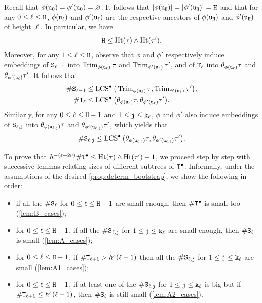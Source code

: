 \documentclass[11pt,reqno]{amsart}
\newcommand{\Ht}{\mathrm{Ht}}
\newcommand{\Trim}{\operatorname{Trim}}
\newcommand{\LCS}{\operatorname{LCS}}
\newcommand{\eps}{\varepsilon}
\begin{document}
Recall that $\phi(\mathtt{u}_0)=\phi'(\mathtt{u}_0)=\varnothing$. It follows that $|\phi(\mathtt{u}_{\mathtt{H}})|=|\phi'(\mathtt{u}_{\mathtt{H}})|=\mathtt{H}$ and that for any $0\leq \ell\leq \mathtt{H}$, $\phi(\mathtt{u}_\ell)$ and $\phi'(\mathtt{u}_\ell)$ are the respective ancestors of $\phi(\mathtt{u}_{\mathtt{H}})$ and $\phi'(\mathtt{u}_{\mathtt{H}})$ of height $\ell$. In particular, we have
\begin{equation}
\label{height_LCS_vs_MIN}
\ttH\leq \Ht(\tau) \wedge \Ht(\tau').
\end{equation}
Moreover, for any $1\leq \ell\leq \mathtt{H}$, observe that $\phi$ and $\phi'$ respectively induce embeddings of $\mathtt{S}_{\ell-1}$ into $\Trim_{\phi(\ttu_\ell)}\tau$ and $\Trim_{\phi'(\ttu_\ell)}\tau'$, and of $\mathtt{T}_{\ell}$ into $\theta_{\phi(\mathtt{u}_\ell)}\tau$ and $\theta_{\phi'(\mathtt{u}_\ell)}\tau'$. It follows that
\begin{align}
\label{spinal_LCS}
\#\ttS_{\ell-1}&\leq \LCS^\bullet\big(\Trim_{\phi(\ttu_\ell)}\tau,\Trim_{\phi'(\ttu_\ell)}\tau'\big),\\
\label{spinal_above_LCS}
\#\ttT_{\ell}&\leq \LCS^\bullet\big(\theta_{\phi(\ttu_\ell)}\tau,\theta_{\phi'(\ttu_\ell)}\tau'\big).
\end{align}
Similarly, for any $0\leq\ell\leq \mathtt{H}-1$ and $1\leq \mathtt{j}\leq \mathtt{k}_{\ell}$, $\phi$ and $\phi'$ also induce embeddings of $\mathtt{S}_{\ell,\mathtt{j}}$ into $\theta_{\phi(\mathtt{u}_{\ell,\mathtt{j}})}\tau$ and $\theta_{\phi'(\mathtt{u}_{\ell,\mathtt{j}})}\tau'$, which yields that
\begin{equation}
\label{spinal_compo_LCS}
\#\ttS_{\ell,\ttj}\leq \LCS^\bullet\big(\theta_{\phi(\ttu_{\ell,\ttj})}\tau,\theta_{\phi'(\ttu_{\ell,\ttj})}\tau'\big).
\end{equation}
\smallskip

To prove that $h^{-(\eps+2\nu)}\#\ttT^\bullet \leq \Ht(\tau)\wedge\Ht(\tau')+1$, we proceed step by step with successive lemmas relating sizes of different subtrees of $\mathtt{T}^\bullet$. Informally, under the assumptions of the desired \cref{prop:determ_bootstrap}, we show the following in order: 
\begin{itemize}
    \item if all the $\#\mathtt{S}_\ell$ for $0\leq \ell\leq \mathtt{H}-1$ are small enough, then $\#\mathtt{T}^\bullet$ is small too (\cref{lem:B_cases});
    \item for $0\leq \ell\leq \mathtt{H}-1$, if all the $\# \mathtt{S}_{\ell,\mathtt{j}}$ for $1\leq \mathtt{j}\leq \mathtt{k}_\ell$ are small enough, then $\#\mathtt{S}_{\ell}$ is small (\cref{lem:A_cases});
    \item for $0\leq \ell \leq \mathtt{H}-1$, if $\#\mathtt{T}_{\ell+1}>h^\varepsilon (\ell+1)$ then all the $\# \mathtt{S}_{\ell,\mathtt{j}}$ for $1\leq \mathtt{j}\leq \mathtt{k}_\ell$ are small (\cref{lem:A1_cases});
    \item for $0\leq \ell\leq \mathtt{H}-1$, if at least one of the $\# \mathtt{S}_{\ell,\mathtt{j}}$ for $1\leq \mathtt{j}\leq \mathtt{k}_\ell$ is big but if $\#\mathtt{T}_{\ell+1}\leq h^\varepsilon(\ell+1)$, then $\#\mathtt{S}_{\ell}$ is still small (\cref{lem:A2_cases}).
\end{itemize}
\end{document}
